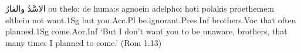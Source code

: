 \documentclass[a4paper]{article}
\begin{document}
 \begin{example}
   \xglll %
   \textarabic{الاسَّدُ والفارُ}\xgle
 ou thelo: de huma:s agnoein adelphoi hoti polakis proetheme:n elthein \xgle 
 not want.1Sg but you.Acc.Pl be.ignorant.Pres.Inf brothers.Voc that often planned.1Sg come.Aor.Inf \xgle
 \glt `But I don't want you to be unaware, brothers, that many times I   planned to come.' 
 \glend
 \hfill (Rom 1.13)
\end{example}
\end{document}
